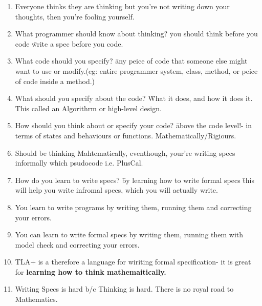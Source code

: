 \documentclass{article}
\begin{document}
\begin{enumerate}
\begin{itemize}
        \end{itemize}
        \item Everyone thinks they are thinking but you're not writing down your thoughts, then you're fooling yourself.
        \item What programmer should know about thinking? \= you should think before you code \= write a spec before you code.    
        \item What code should you specify? \= any peice of code that someone else might want to use or modify.(eg: entire programmer system, class, method, or peice of code inside a method.)
        \item What should you specify about the code? \= What it does, and how it does it. This called an Algorithrm or high-level design. 
        \item How should you think about or specify your code? \= above the code level!- in terms of states and behaviours or functions. Mathematically/Rigiours. 
        \item Should be thinking Mahtematically, eventhough, your're writing specs informally which psudocode i.e. PlusCal.
        \item How do you learn to write specs? \= by learning how to write formal specs \= this will help you write infromal specs, which you will actually write.
        \item You learn to write programs by writing them, running them and correcting your errors.
        \item You can learn to write formal specs by writing them, running them with model check and correcting your errors.
        \item TLA+ is a therefore a language for wiriting formal specification- it is great for \textbf{learning how to think mathemaitically.}
        \item Writing Specs is hard b/c Thinking is hard. There is no royal road to Mathematics.
    \end{enumerate}
\end{document}
